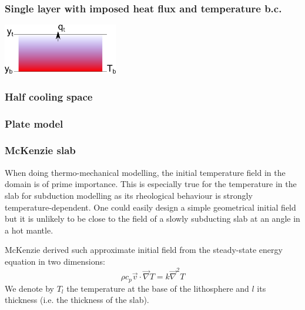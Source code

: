 

 
\subsubsection{Single layer with imposed heat flux and temperature b.c. }

\begin{center}
\includegraphics[width=5cm]{images/initial_temperature/tempcond3.png}
\end{center}



\subsubsection{Half cooling space}

\subsubsection{Plate model}

\subsubsection{McKenzie slab}

When doing thermo-mechanical modelling, the initial temperature
field in the domain is of prime importance. This is 
especially true for the temperature in the slab for subduction 
modelling as its rheological behaviour is strongly temperature-dependent. 
One could easily design a simple geometrical initial field but it is 
unlikely to be close to the field of a slowly subducting slab at an angle 
in a hot mantle. 

McKenzie \cite{mcke69} derived such approximate initial field from the 
steady-state energy equation in two dimensions:
\[
\rho c_p \vec v \cdot \vec\nabla T = k \vec\nabla^2 T
\]
We denote by $T_l$ the temperature at the base of the lithosphere
and $l$ its thickness (i.e. the thickness of the slab).

